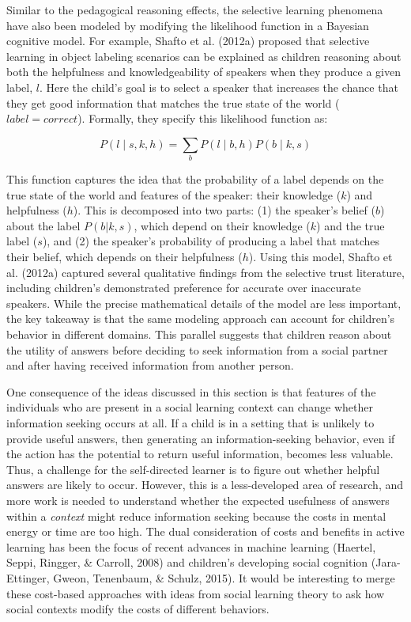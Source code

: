 \documentclass[oneside]{report}
\begin{document}
Similar to the pedagogical reasoning effects, the selective learning
phenomena have also been modeled by modifying the likelihood function in
a Bayesian cognitive model. For example, Shafto et al. (2012a) proposed
that selective learning in object labeling scenarios can be explained as
children reasoning about both the helpfulness and knowledgeability of
speakers when they produce a given label, \(l\). Here the child's goal
is to select a speaker that increases the chance that they get good
information that matches the true state of the world
(\(label=correct\)). Formally, they specify this likelihood function as:

\[P(l \mid s,k,h) = \sum_b P(l \mid b,h)P(b \mid k,s)\]

\noindent
This function captures the idea that the probability of a label depends
on the true state of the world and features of the speaker: their
knowledge (\(k\)) and helpfulness (\(h\)). This is decomposed into two
parts: (1) the speaker's belief (\(b\)) about the label \(P(b|k,s)\),
which depend on their knowledge (\(k\)) and the true label (\(s\)), and
(2) the speaker's probability of producing a label that matches their
belief, which depends on their helpfulness (\(h\)). Using this model,
Shafto et al. (2012a) captured several qualitative findings from the
selective trust literature, including children's demonstrated preference
for accurate over inaccurate speakers. While the precise mathematical
details of the model are less important, the key takeaway is that the
same modeling approach can account for children's behavior in different
domains. This parallel suggests that children reason about the utility
of answers before deciding to seek information from a social partner and
after having received information from another person.

One consequence of the ideas discussed in this section is that features
of the individuals who are present in a social learning context can
change whether information seeking occurs at all. If a child is in a
setting that is unlikely to provide useful answers, then generating an
information-seeking behavior, even if the action has the potential to
return useful information, becomes less valuable. Thus, a challenge for
the self-directed learner is to figure out whether helpful answers are
likely to occur. However, this is a less-developed area of research, and
more work is needed to understand whether the expected usefulness of
answers within a \emph{context} might reduce information seeking because
the costs in mental energy or time are too high. The dual consideration
of costs and benefits in active learning has been the focus of recent
advances in machine learning (Haertel, Seppi, Ringger, \& Carroll, 2008)
and children's developing social cognition (Jara-Ettinger, Gweon,
Tenenbaum, \& Schulz, 2015). It would be interesting to merge these
cost-based approaches with ideas from social learning theory to ask how
social contexts modify the costs of different behaviors.
\end{document}

